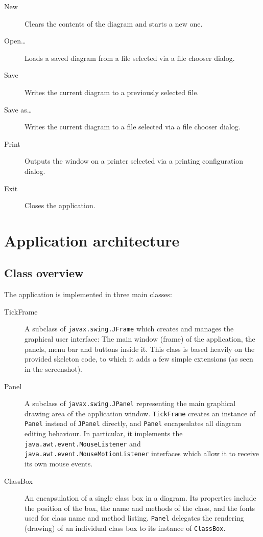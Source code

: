 \documentclass[11pt]{article}
\begin{document}
\begin{description}
\item[New] Clears the contents of the diagram and starts a new one.
\item[Open\dots] Loads a saved diagram from a file selected via a file chooser
    dialog.
\item[Save] Writes the current diagram to a previously selected file.
\item[Save as\dots] Writes the current diagram to a file selected via a file
    chooser dialog.
\item[Print] Outputs the window on a printer selected via a printing
    configuration dialog.
\item[Exit] Closes the application.
\end{description}


\section{Application architecture}
\subsection{Class overview}
The application is implemented in three main classes:

\begin{description}
\item[TickFrame] A subclass of {\tt javax.swing.JFrame} which creates and
    manages the graphical user interface: The main window (frame) of the
    application, the panels, menu bar and buttons inside it. This class is
    based heavily on the provided skeleton code, to which it adds a few
    simple extensions (as seen in the screenshot).
\item[Panel] A subclass of {\tt javax.swing.JPanel} representing the main
    graphical drawing area of the application window. {\tt TickFrame} creates
    an instance of {\tt Panel} instead of {\tt JPanel} directly, and
    {\tt Panel} encapsulates all diagram editing behaviour. In particular, it
    implements the {\tt java.awt.event.MouseListener} and
    {\tt java.awt.event.Mouse\-Motion\-Listener} interfaces which allow it to
    receive its own mouse events.
\item[ClassBox] An encapsulation of a single class box in a diagram. Its
    properties include the position of the box, the name and methods of the
    class, and the fonts used for class name and method listing. {\tt Panel}
    delegates the rendering (drawing) of an individual class box to its
    instance of {\tt ClassBox}.
\end{description}
\end{document}
